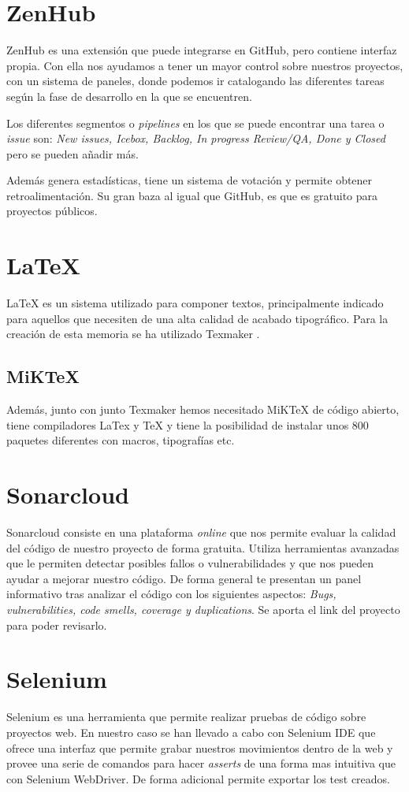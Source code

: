 \section{ZenHub}
ZenHub \cite{ZenHub} es una extensión que puede integrarse en GitHub, pero contiene interfaz propia.
Con ella nos ayudamos a tener un mayor control sobre nuestros proyectos, con un sistema de paneles, donde podemos ir catalogando las diferentes tareas según la fase de desarrollo en la que se encuentren. 

Los diferentes segmentos o \textit{pipelines} en los que se puede encontrar una tarea o \textit{issue} son: \textit{New issues, Icebox, Backlog, In progress Review/QA, Done y Closed} pero se pueden añadir más.

Además genera estadísticas, tiene un sistema de votación y permite obtener retroalimentación. Su gran baza al igual que GitHub, es que es gratuito para proyectos públicos. 

\section{LaTeX}
LaTeX \cite{latex} es un sistema utilizado para componer textos, principalmente indicado para aquellos que necesiten de una alta calidad de acabado tipográfico. Para la creación de esta memoria se ha utilizado Texmaker \cite{texmaker}.

\subsection{MiKTeX}
Además, junto con junto Texmaker hemos necesitado MiKTeX \cite{miktex} de código abierto, tiene compiladores LaTex y TeX y tiene la posibilidad de instalar unos 800 paquetes diferentes con macros, tipografías etc.

\section{Sonarcloud}
Sonarcloud\cite{sonarcloud} consiste en una plataforma \textit{online} que nos permite evaluar la calidad del código de nuestro proyecto de forma gratuita. Utiliza herramientas avanzadas que le permiten detectar posibles fallos o vulnerabilidades y que nos pueden ayudar a mejorar nuestro código. De forma general te presentan un panel informativo tras analizar el código con los siguientes aspectos: \textit{Bugs, vulnerabilities, code smells, coverage y duplications}. Se aporta el link del proyecto para poder revisarlo.

\section{Selenium}
Selenium\cite{selenium} es una herramienta que permite realizar pruebas de código sobre proyectos web. En nuestro caso se han llevado a cabo con Selenium IDE que ofrece una interfaz que permite grabar nuestros movimientos dentro de la web y provee una serie de comandos para hacer \textit{asserts} de una forma mas intuitiva que con Selenium WebDriver. De forma adicional permite exportar los test creados. 


